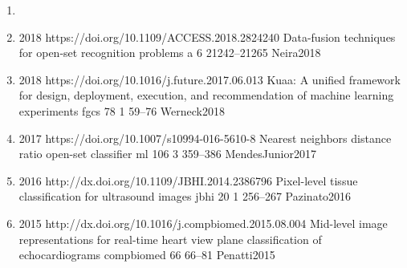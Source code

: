 \begin{enumerate}
\item{}
\item{}
  {
  }
  {2018}
  {https://doi.org/10.1109/ACCESS.2018.2824240}
  {Data-fusion techniques for open-set recognition problems}
  {a}
  {6}
  {}
  {21242--21265}
  {Neira2018}
\item{}
  {
  }
  {2018}
  {https://doi.org/10.1016/j.future.2017.06.013}
  {Kuaa: A unified framework for design, deployment, execution, and recommendation of machine learning experiments}
  {fgcs}
  {78}
  {1}
  {59--76}
  {Werneck2018}
\item{}
  {
  }
  {2017}
  {https://doi.org/10.1007/s10994-016-5610-8}
  {Nearest neighbors distance ratio open-set classifier}
  {ml}
  {106}
  {3}
  {359--386}
  {MendesJunior2017}
\item{}
  {
  }
  {2016}
  {http://dx.doi.org/10.1109/JBHI.2014.2386796}
  {Pixel-level tissue classification for ultrasound images}
  {jbhi}
  {20}
  {1}
  {256--267}
  {Pazinato2016}
\item{}
  {
  }
  {2015}
  {http://dx.doi.org/10.1016/j.compbiomed.2015.08.004}
  {Mid-level image representations for real-time heart view plane classification of echocardiograms}
  {compbiomed}
  {66}
  {}
  {66--81}
  {Penatti2015}
\end{enumerate}

